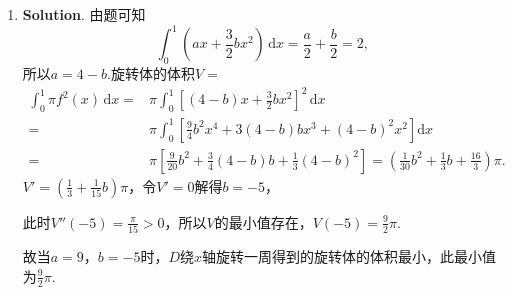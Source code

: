 \documentclass[../main.tex]{subfiles}
\begin{document}
\begin{enumerate}
    \item \textbf{Solution}. 由题可知
          \[
              \int_{0}^{1}\left(ax+\frac{3}{2}bx^{2}
              \right)\,\mathrm{d}x=\frac{a}{2}+\frac{b}{2}=2,
          \]
          所以$a=4-b$.旋转体的体积$V=$
          \[
              \begin{aligned}
                  \int_{0}^{1}\pi f^{2}(x)\,\mathrm{d}x = {} & \pi\int_{0}^{1}\left[(4-b)x+\frac{3}{2}bx^{2}\right]^{2}\,\mathrm{d}x                                                                   \\
                  = {}                                       & \pi\int_{0}^{1}\left[\frac{9}{4}b^{2}x^{4}+3(4-b)bx^{3}+(4-b)^{2} x^{2}\right]\mathrm{d}x                                               \\
                  = {}                                       & \pi\left[\frac{9}{20}b^{2}+\frac{3}{4}(4-b)b+\frac{1}{3}(4-b)^{2}\right] = \left(\frac{1}{30}b^{2}+\frac{1}{3}b+\frac{16}{3}\right)\pi.
              \end{aligned}
          \]
          $V'=\left(\frac{1}{3}+\frac{1}{15}b\right)\pi$，令$V'=0$解得$b=-5$，

          此时$V''(-5)=\frac{\pi}{15}>0$，所以$V$的最小值存在，$V(-5)=\frac{9}{2}\pi$.

          故当$a=9$，$b=-5$时，$D$绕$x$轴旋转一周得到的旋转体的体积最小，此最小值为$\frac{9}{2}
              \pi$.
\end{enumerate}
\end{document}
